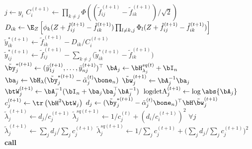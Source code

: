 \documentclass[]{article}
\begin{document}
\begin{algorithm}[H]
\begin{algorithmic}[1]
    \State $j \gets y_i$
    \State $C_i^{(t+1)} \gets \prod_{k \neq j} \Phi\left( (\tilde f_{ij}^{(t+1)} - \tilde f_{ik}^{(t+1)}) / \surd 2 \right)$ \vspace{1mm}   
     \vspace{1mm}  
      \State $D_{ik} \gets \E_Z\left[\phi_k(Z + \tilde f_{ij}^{(t+1)} - \tilde f_{ik}^{(t+1)}) \prod_{l \neq k,j} \Phi_l(Z + \tilde f_{ij}^{(t+1)} - \tilde f_{ik}^{(t+1)}) \right]$ \vspace{1mm}
      \State $\tilde y_{ik}^{*(t+1)} \gets \tilde f_{ik}^{(t+1)} - D_{ik} / C_i^{(t+1)}$
    \EndFor
    \State $\tilde y_{ij}^{*(t+1)} \gets \tilde f_{ij}^{(t+1)} - \sum_{k \neq j} \big(\tilde y_{ik}^{*(t+1)} - \tilde f_{ik}^{(t+1)} \big)$
  \EndFor
\EndProcedure
\Statex
{}
    \State $\tilde\by_j^{*(t+1)} \gets (\tilde y_{1j}^{(t+1)}, \dots, \tilde y_{nj}^{(t+1)})^\top$
    \State $\bA_j \gets \bH_{\lambda_j}^{sq(t)} + \bI_{n}$ \vspace{0.8mm}
    \State $\ba_j \gets \bH_\lambda(\tilde\by_j^{*(t+1)} - \tilde\alpha_j^{(t)}\bone_{n})$
    \State $\tilde\bw_j^{(t+1)} \gets \bA_j^{-1}\ba_j$
    \State $\btW_j^{(t+1)} \gets \bA_j^{-1}(\bI_{n} + \ba_j\ba_j^\top\bA_j^{-1})$\
    \State $\text{logdetA}_j^{(t+1)} \gets \log \abs{\bA_j}$
  \EndFor
\EndProcedure
\Statex
{}
    \State $c_j^{(t+1)} \gets \tr \left(  \bH^2 \btW_j \right) $
    \State $d_j \gets (\tilde\by_j^{*(t+1)} - \tilde\alpha_j^{(t)}\bone_{n})^\top \bH \tilde\bw_j^{(t+1)}$
    \State $\tilde\lambda_j^{(t+1)} \gets d_j / c_j^{(t+1)}$
    \State $\tilde\lambda_j^{sq(t+1)} \gets 1/c_j^{(t)} + (d_i / c_i^{(t+1)})^2$          
  \EndFor
     $\forall j$
      \State $\tilde\lambda_j^{(t+1)} \gets \sum_j d_j \Big/ \sum_j c_j^{(t+1)}$
      \State $\tilde\lambda_j^{sq(t+1)} \gets 1 \Big/ \sum_j c_j^{(t+1)} + \Big( \sum_j d_j \Big/ \sum_j c_j^{(t+1)} \Big)^2$  
  \EndIf
  \State \textbf{call} 
\EndProcedure
{}	
\end{algorithmic}
\end{algorithm}
\end{document}
